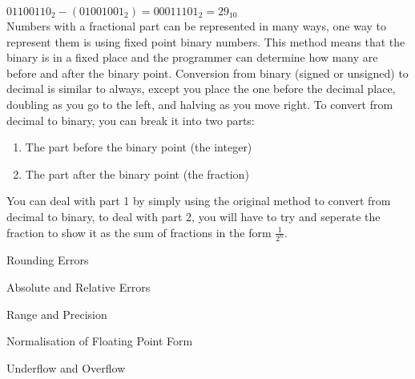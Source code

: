  \noindent
  $ 01100110_2 - (01001001_2) = 00011101_2 = 29_{10} $\\
  Numbers with a fractional part can be represented in many ways, one way to represent them is using fixed point binary numbers. This method means that the binary is in a fixed place and the programmer can determine how many are before and after the binary point. Conversion from binary (signed or unsigned) to decimal is similar to always, except you place the one before the decimal place, doubling as you go to the left, and halving as you move right. To convert from decimal to binary, you can break it into two parts:
  \begin{enumerate}
    \setlength{\itemsep}{0em}
    \item The part before the binary point (the integer)
    \item The part after the binary point (the fraction)
  \end{enumerate}
  You can deal with part 1 by simply using the original method to convert from decimal to binary, to deal with part 2, you will have to try and seperate the fraction to show it as the sum of fractions in the form $ \frac{1}{2^n} $.
  
  \noindent
  Rounding Errors
  
  \noindent
  Absolute and Relative Errors
  
  \noindent
  Range and Precision
  
  \noindent
  Normalisation of Floating Point Form
  
  \noindent
  Underflow and Overflow
  
